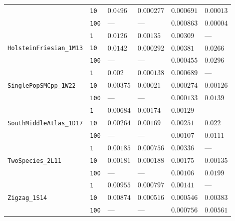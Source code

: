 \begin{footnotesize}
\begin{tabular}{llllll}
 & \texttt{10} & $0.0496$ & $0.000277$ & $0.000691$ & $0.00013$ \\
 & \texttt{100} & --- & --- & $0.000863$ & $0.00004$ \\
\cline{1-6}
\multirow[c]{3}{*}{\texttt{HolsteinFriesian\_1M13}} & \texttt{1} & $0.0126$ & $0.00135$ & $0.00309$ & --- \\
 & \texttt{10} & $0.0142$ & $0.000292$ & $0.00381$ & $0.0266$ \\
 & \texttt{100} & --- & --- & $0.000455$ & $0.0296$ \\
\cline{1-6}
\multirow[c]{3}{*}{\texttt{SinglePopSMCpp\_1W22}} & \texttt{1} & $0.002$ & $0.000138$ & $0.000689$ & --- \\
 & \texttt{10} & $0.00375$ & $0.00021$ & $0.000274$ & $0.00126$ \\
 & \texttt{100} & --- & --- & $0.000133$ & $0.0139$ \\
\cline{1-6}
\multirow[c]{3}{*}{\texttt{SouthMiddleAtlas\_1D17}} & \texttt{1} & $0.00684$ & $0.00174$ & $0.00129$ & --- \\
 & \texttt{10} & $0.00264$ & $0.00169$ & $0.00251$ & $0.022$ \\
 & \texttt{100} & --- & --- & $0.00107$ & $0.0111$ \\
\cline{1-6}
\multirow[c]{3}{*}{\texttt{TwoSpecies\_2L11}} & \texttt{1} & $0.00185$ & $0.000756$ & $0.00336$ & --- \\
 & \texttt{10} & $0.00181$ & $0.000188$ & $0.00175$ & $0.00135$ \\
 & \texttt{100} & --- & --- & $0.00106$ & $0.0199$ \\
\cline{1-6}
\multirow[c]{3}{*}{\texttt{Zigzag\_1S14}} & \texttt{1} & $0.00955$ & $0.000797$ & $0.00141$ & --- \\
 & \texttt{10} & $0.00874$ & $0.000516$ & $0.000546$ & $0.00383$ \\
 & \texttt{100} & --- & --- & $0.000756$ & $0.00561$ \\
\cline{1-6}
\bottomrule
\end{tabular}
\end{footnotesize}
